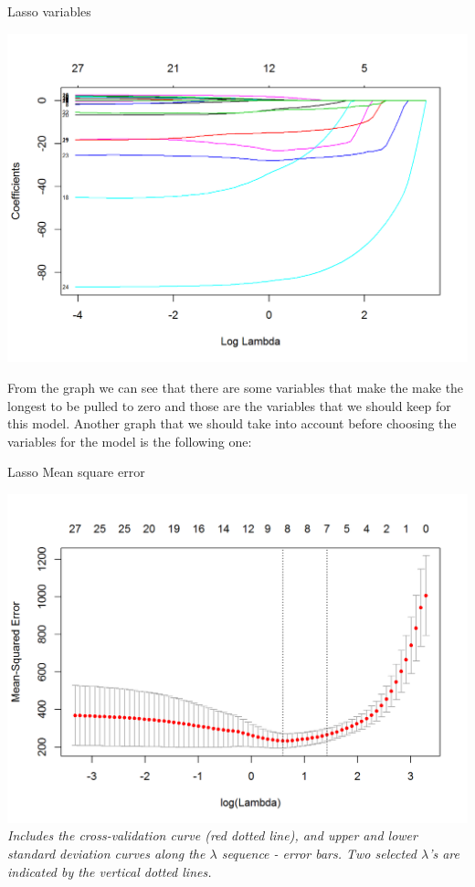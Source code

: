 \documentclass{article}
\begin{document}
\begin{table}[H]
\centering
\caption{Lasso variables}
\begin{center}
\includegraphics[scale=0.5]{../R/photos/70_lasso.png}   \\
\end{center}
\end{table}
From the graph we can see that there are some variables that make the make the longest to be pulled to zero and those are the variables that we should keep for this model.
Another graph that we should take into account before choosing the variables for the model is the following one:
\begin{table}[H]
\centering
\caption{Lasso Mean square error}
\begin{center}
\includegraphics[scale=0.5]{../R/photos/71_lassob.png}    \\
\textit{Includes the cross-validation curve (red dotted line), and upper and lower standard deviation curves along the $\lambda$ sequence - error bars. Two selected $\lambda$’s are indicated by the vertical dotted lines.}
\end{center}
\end{table}
\end{document}
